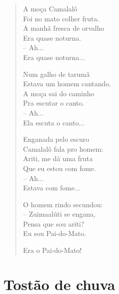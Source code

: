 \begin{verse}
A moça Camalalô\\
Foi no mato colher fruta.\\
A manhã fresca de orvalho\\
Era quase noturna.\\
\quad-- Ah...\\
Era quase noturna...

Num galho de tarumã\\
Estava um homem cantando.\\
A moça sai do caminho\\
Pra escutar o canto.\\
\quad-- Ah...\\
Ela escuta o canto...

Enganada pelo escuro\\
Camalalô fala pro homem:\\
Ariti, me dá uma fruta\\
Que eu estou com fome.\\
\quad-- Ah...\\
Estava com fome...

O homem rindo secundou:\\
-- Zuimaalúti se engana,\\
Pensa que sou ariti?\\
Eu sou Pai-do-Mato.

Era o Pai-do-Mato!
\end{verse}

\pagebreak
{}
\section{Tostão de chuva}

